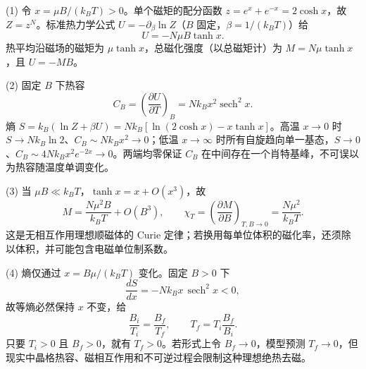 (1) 令 \(x=\mu B/(k_BT)>0\)。单个磁矩的配分函数 \(z=e^x+e^{-x}=2\cosh x\)，故 \(Z=z^N\)。标准热力学公式 \(U=-\partial_\beta\ln Z\)（\(B\) 固定，\(\beta=1/(k_BT)\)）给
\[
U=-N\mu B\tanh x.
\]
热平均沿磁场的磁矩为 \(\mu\tanh x\)，总磁化强度（以总磁矩计）为 \(M=N\mu\tanh x\)，且 \(U=-MB\)。

(2) 固定 \(B\) 下热容
\[
C_B=\left(\frac{\partial U}{\partial T}\right)_B
=Nk_Bx^2\operatorname{sech}^2x.
\]
熵 \(S=k_B(\ln Z+\beta U)=Nk_B[\ln(2\cosh x)-x\tanh x]\)。高温 \(x\to0\) 时 \(S\to Nk_B\ln2\)、\(C_B\sim Nk_Bx^2\to0\)；低温 \(x\to\infty\) 时所有自旋趋向单一基态，\(S\to0\)、\(C_B\sim4Nk_Bx^2e^{-2x}\to0\)。两端均零保证 \(C_B\) 在中间存在一个肖特基峰，不可误以为热容随温度单调变化。

(3) 当 \(\mu B\ll k_BT\)，\(\tanh x=x+O(x^3)\)，故
\[
M=\frac{N\mu^2B}{k_BT}+O(B^3),\qquad
\chi_T=\left(\frac{\partial M}{\partial B}\right)_{T,B\to0}
=\frac{N\mu^2}{k_BT}.
\]
这是无相互作用理想顺磁体的 Curie 定律；若换用每单位体积的磁化率，还须除以体积，并可能包含电磁单位制系数。

(4) 熵仅通过 \(x=B\mu/(k_BT)\) 变化。固定 \(B>0\) 下
\[
\frac{dS}{dx}=-Nk_Bx\,\operatorname{sech}^2x<0,
\]
故等熵必然保持 \(x\) 不变，给
\[
\frac{B_i}{T_i}=\frac{B_f}{T_f},\qquad T_f=T_i\frac{B_f}{B_i}.
\]
只要 \(T_i>0\) 且 \(B_f>0\)，就有 \(T_f>0\)。若形式上令 \(B_f\to0\)，模型预测 \(T_f\to0\)，但现实中晶格热容、磁相互作用和不可逆过程会限制这种理想绝热去磁。
